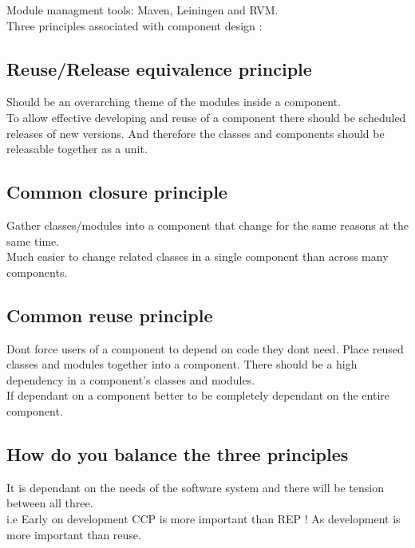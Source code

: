 \documentclass[11pt]{scrartcl} %
\begin{document}
Module managment tools: Maven, Leiningen and RVM.\\

Three principles associated with component design :

\subsection{Reuse/Release equivalence principle}

Should be an overarching theme of the modules inside a component.\\

To allow effective developing and reuse of a component there should be
scheduled releases of new versions. And therefore the classes and
components should be releasable together as a unit.

\subsection{Common closure principle}

Gather classes/modules into a component that change for the same
reasons at the same time.\\

Much easier to change related classes in a single component than across
many components.

\subsection{Common reuse principle}

Dont force users of a component to depend on code they dont need.
Place reused classes and modules together into a component. There
should be a high dependency in a component's classes and modules.\\

If dependant on a component better to be completely dependant on the
entire component.

\subsection{How do you balance the three principles}

It is dependant on the needs of the software system and there will be
tension between all three.\\

i.e Early on development CCP is more important than REP ! As development
is more important than reuse.
\end{document}
